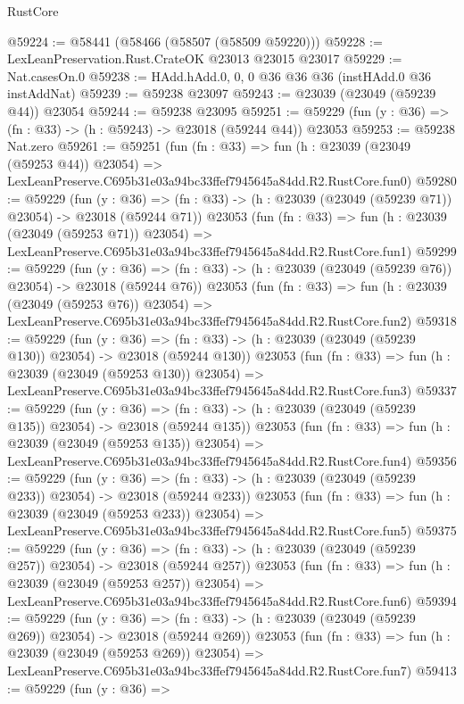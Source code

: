 \begin{lexlean}{RustCore}
\begin{coremodule}
@59224 := @58441 (@58466 (@58507 (@58509 @59220)))
@59228 := LexLeanPreservation.Rust.CrateOK @23013 @23015 @23017
@59229 := Nat.casesOn.{0}
@59238 := HAdd.hAdd.{0, 0, 0} @36 @36 @36 (instHAdd.{0} @36 instAddNat)
@59239 := @59238 @23097
@59243 := @23039 (@23049 (@59239 @44)) @23054
@59244 := @59238 @23095
@59251 := @59229 (fun (y : @36) => (fn : @33) -> (h : @59243) -> @23018 (@59244 @44)) @23053
@59253 := @59238 Nat.zero
@59261 := @59251
    (fun (fn : @33) =>
    fun (h : @23039 (@23049 (@59253 @44)) @23054) =>
    LexLeanPreserve.C695b31e03a94bc33ffef7945645a84dd.R2.RustCore.fun0)
@59280 := @59229
    (fun (y : @36) =>
    (fn : @33) -> (h : @23039 (@23049 (@59239 @71)) @23054) -> @23018 (@59244 @71))
    @23053
    (fun (fn : @33) =>
    fun (h : @23039 (@23049 (@59253 @71)) @23054) =>
    LexLeanPreserve.C695b31e03a94bc33ffef7945645a84dd.R2.RustCore.fun1)
@59299 := @59229
    (fun (y : @36) =>
    (fn : @33) -> (h : @23039 (@23049 (@59239 @76)) @23054) -> @23018 (@59244 @76))
    @23053
    (fun (fn : @33) =>
    fun (h : @23039 (@23049 (@59253 @76)) @23054) =>
    LexLeanPreserve.C695b31e03a94bc33ffef7945645a84dd.R2.RustCore.fun2)
@59318 := @59229
    (fun (y : @36) =>
    (fn : @33) -> (h : @23039 (@23049 (@59239 @130)) @23054) -> @23018 (@59244 @130))
    @23053
    (fun (fn : @33) =>
    fun (h : @23039 (@23049 (@59253 @130)) @23054) =>
    LexLeanPreserve.C695b31e03a94bc33ffef7945645a84dd.R2.RustCore.fun3)
@59337 := @59229
    (fun (y : @36) =>
    (fn : @33) -> (h : @23039 (@23049 (@59239 @135)) @23054) -> @23018 (@59244 @135))
    @23053
    (fun (fn : @33) =>
    fun (h : @23039 (@23049 (@59253 @135)) @23054) =>
    LexLeanPreserve.C695b31e03a94bc33ffef7945645a84dd.R2.RustCore.fun4)
@59356 := @59229
    (fun (y : @36) =>
    (fn : @33) -> (h : @23039 (@23049 (@59239 @233)) @23054) -> @23018 (@59244 @233))
    @23053
    (fun (fn : @33) =>
    fun (h : @23039 (@23049 (@59253 @233)) @23054) =>
    LexLeanPreserve.C695b31e03a94bc33ffef7945645a84dd.R2.RustCore.fun5)
@59375 := @59229
    (fun (y : @36) =>
    (fn : @33) -> (h : @23039 (@23049 (@59239 @257)) @23054) -> @23018 (@59244 @257))
    @23053
    (fun (fn : @33) =>
    fun (h : @23039 (@23049 (@59253 @257)) @23054) =>
    LexLeanPreserve.C695b31e03a94bc33ffef7945645a84dd.R2.RustCore.fun6)
@59394 := @59229
    (fun (y : @36) =>
    (fn : @33) -> (h : @23039 (@23049 (@59239 @269)) @23054) -> @23018 (@59244 @269))
    @23053
    (fun (fn : @33) =>
    fun (h : @23039 (@23049 (@59253 @269)) @23054) =>
    LexLeanPreserve.C695b31e03a94bc33ffef7945645a84dd.R2.RustCore.fun7)
@59413 := @59229
    (fun (y : @36) =>

\end{coremodule}
\end{lexlean}
